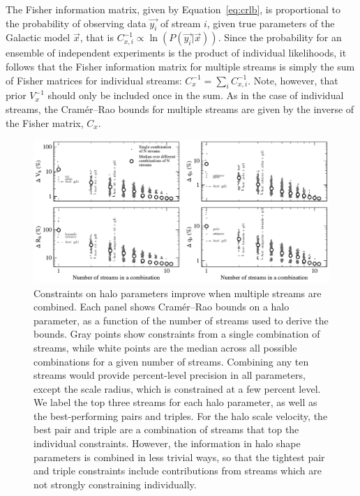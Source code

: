 \documentclass[modern]{aastex61}
\begin{document}
The Fisher information matrix, given by Equation~\ref{eq:crlb}, is proportional to the probability of observing data $\vec{y_i}$ of stream $i$, given true parameters of the Galactic model $\vec{x}$, that is $C_{x,i}^{-1}\propto \ln(P(\vec{y_i}|\vec{x}))$.
Since the probability for an ensemble of independent experiments is the product of individual likelihoods, it follows that the Fisher information matrix for multiple streams is simply the sum of Fisher matrices for individual streams: $C_x^{-1} = \sum_{i} C_{x,i}^{-1}$.
Note, however, that prior $V_x^{-1}$ should only be included once in the sum.
As in the case of individual streams, the Cram\' er--Rao bounds for multiple streams are given by the inverse of the Fisher matrix, $C_x$.

\begin{figure}
\begin{center}
\includegraphics[width=\textwidth]{nstream_improvement.pdf}
\caption{Constraints on halo parameters improve when multiple streams are combined.
Each panel shows Cram\'er--Rao bounds on a halo parameter, as a function of the number of streams used to derive the bounds.
Gray points show constraints from a single combination of streams, while white points are the median across all possible combinations for a given number of streams.
Combining any ten streams would provide percent-level precision in all parameters, except the scale radius, which is constrained at a few percent level.
We label the top three streams for each halo parameter, as well as the best-performing pairs and triples.
For the halo scale velocity, the best pair and triple are a combination of streams that top the individual constraints.
However, the information in halo shape parameters is combined in less trivial ways, so that the tightest pair and triple constraints include contributions from streams which are not strongly constraining individually.
}
\label{fig:nstream_summary}
\end{center}
\end{figure}
\end{document}
